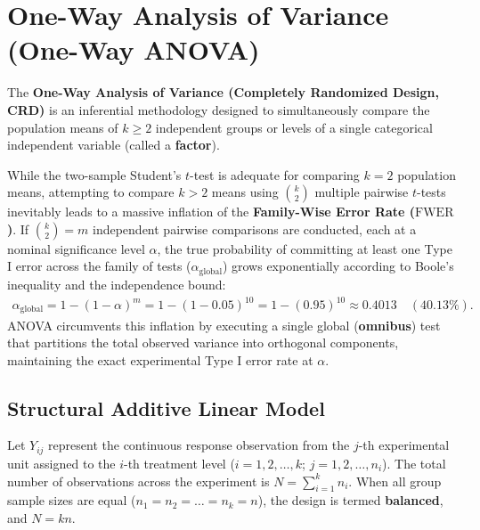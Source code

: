 \section{One-Way Analysis of Variance (One-Way ANOVA)}

The \textbf{One-Way Analysis of Variance (Completely Randomized Design, CRD)} is an inferential methodology designed to simultaneously compare the population means of $k \geq 2$ independent groups or levels of a single categorical independent variable (called a \textbf{factor}).

While the two-sample Student's $t$-test is adequate for comparing $k=2$ population means, attempting to compare $k > 2$ means using $\binom{k}{2}$ multiple pairwise $t$-tests inevitably leads to a massive inflation of the \textbf{Family-Wise Error Rate ($\text{FWER}$)}. If $\binom{k}{2} = m$ independent pairwise comparisons are conducted, each at a nominal significance level $\alpha$, the true probability of committing at least one Type I error across the family of tests ($\alpha_{\text{global}}$) grows exponentially according to Boole's inequality and the independence bound:
\begin{align}
	\alpha_{\text{global}} = 1 - (1 - \alpha)^m = 1 - (1 - 0.05)^{10} = 1 - (0.95)^{10} \approx 0.4013 \quad (40.13\%).
\end{align}
ANOVA circumvents this inflation by executing a single global (\textbf{omnibus}) test that partitions the total observed variance into orthogonal components, maintaining the exact experimental Type I error rate at $\alpha$.

\subsection{Structural Additive Linear Model}

Let $Y_{ij}$ represent the continuous response observation from the $j$-th experimental unit assigned to the $i$-th treatment level ($i = 1, 2, \dots, k$; $j = 1, 2, \dots, n_i$). The total number of observations across the experiment is $N = \sum_{i=1}^k n_i$. When all group sample sizes are equal ($n_1 = n_2 = \dots = n_k = n$), the design is termed \textbf{balanced}, and $N = kn$.

